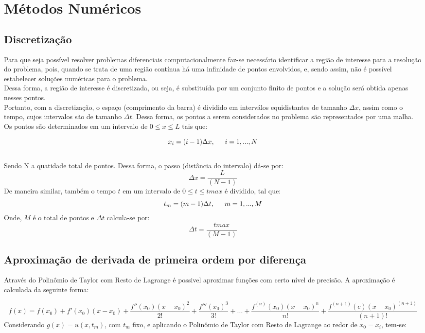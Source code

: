 \documentclass[a4paper,11pt]{article}
\begin{document}
\section{Métodos Numéricos}

\subsection{Discretização}
Para que seja possível resolver problemas diferenciais computacionalmente faz-se necessário identificar a região de interesse para a resolução do problema, pois, quando se trata de uma região contínua há uma infinidade de pontos envolvidos, e, sendo assim, não é possível estabelecer soluções numéricas para o problema. \\ \indent Dessa forma, a região de interesse é discretizada, ou seja, é substituída por um conjunto finito de pontos e a solução será obtida apenas nesses pontos. \\ \indent Portanto, com a discretização, o espaço (comprimento da barra) é dividido em interválos equidistantes de tamanho $\Delta x$, assim como o tempo, cujos intervalos são de tamanho $\Delta t$. Dessa forma, os pontos a serem considerados no problema são representados por uma malha. \\ \indent Os pontos são determinados em um intervalo de $0 \leq x \leq L$ tais que:

$$x_i = (i-1)\Delta x, \indent i=1, ... , N$$ 
\\ \indent Sendo N a quatidade total de pontos. Dessa forma, o passo (distância do intervalo) dá-se por:
$$\Delta x=\frac{L}{(N-1)}$$
\indent De maneira similar, também o tempo $t$ em um intervalo de $0 \leq t \leq tmax$ é dividido, tal que:
$$t_m=(m-1)\Delta t, \indent m=1, ... , M$$
\indent Onde, $M$ é o total de pontos e $\Delta t$ calcula-se por:
$$\Delta t=\frac{tmax}{(M-1)}$$


\subsection{Aproximação de derivada de primeira ordem por diferença}
Através do Polinômio de Taylor com Resto de Lagrange é possivel aproximar funções com certo nível de precisão. A aproximação é calculada da seguinte forma:

$$f(x)=f(x_0)+f'(x_0)(x-x_0)+\frac{f''(x_0)(x-x_0)^2}{2!}+\frac{f'''(x_0)^3}{3!}+ ... +\frac{f^{(n)}(x_0)(x-x_0)^n}{n!}+\frac{f^{(n+1)}(c)(x-x_0)^{(n+1)}}{(n+1)!}$$
\indent Considerando $g(x)=u(x,t_m)$, com $t_m$ fixo, e aplicando o Polinômio de Taylor com Resto de Lagrange ao redor de $x_0=x_i$, tem-se:
\end{document}

